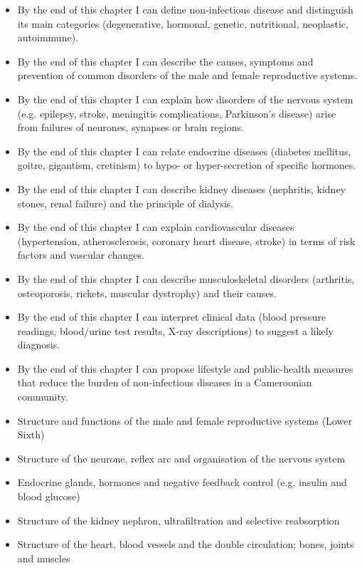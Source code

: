 \documentclass[11pt]{article}
\begin{document}
\begin{objectifs}
\begin{itemize}
\item By the end of this chapter I can define non-infectious disease and distinguish its main categories (degenerative, hormonal, genetic, nutritional, neoplastic, autoimmune).
\item By the end of this chapter I can describe the causes, symptoms and prevention of common disorders of the male and female reproductive systems.
\item By the end of this chapter I can explain how disorders of the nervous system (e.g. epilepsy, stroke, meningitis complications, Parkinson's disease) arise from failures of neurones, synapses or brain regions.
\item By the end of this chapter I can relate endocrine diseases (diabetes mellitus, goitre, gigantism, cretinism) to hypo- or hyper-secretion of specific hormones.
\item By the end of this chapter I can describe kidney diseases (nephritis, kidney stones, renal failure) and the principle of dialysis.
\item By the end of this chapter I can explain cardiovascular diseases (hypertension, atherosclerosis, coronary heart disease, stroke) in terms of risk factors and vascular changes.
\item By the end of this chapter I can describe musculoskeletal disorders (arthritis, osteoporosis, rickets, muscular dystrophy) and their causes.
\item By the end of this chapter I can interpret clinical data (blood pressure readings, blood/urine test results, X-ray descriptions) to suggest a likely diagnosis.
\item By the end of this chapter I can propose lifestyle and public-health measures that reduce the burden of non-infectious diseases in a Cameroonian community.
\end{itemize}
\end{objectifs}

\begin{prerequis}
\begin{itemize}
\item Structure and functions of the male and female reproductive systems (Lower Sixth)
\item Structure of the neurone, reflex arc and organisation of the nervous system
\item Endocrine glands, hormones and negative feedback control (e.g. insulin and blood glucose)
\item Structure of the kidney nephron, ultrafiltration and selective reabsorption
\item Structure of the heart, blood vessels and the double circulation; bones, joints and muscles
\end{itemize}
\end{prerequis}
\end{document}
